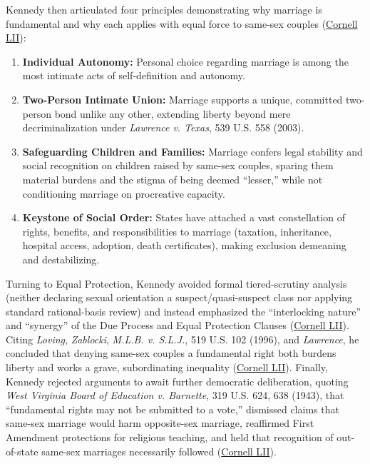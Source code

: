 \documentclass[12pt]{article}
\begin{document}
Kennedy then articulated four principles demonstrating why marriage is fundamental and why each applies with equal force to same-sex couples (\href{https://www.law.cornell.edu/supremecourt/text/14-556}{Cornell LII}):
\begin{enumerate}
    \item \textbf{Individual Autonomy:} Personal choice regarding marriage is among the most intimate acts of self-definition and autonomy.
    \item \textbf{Two-Person Intimate Union:} Marriage supports a unique, committed two-person bond unlike any other, extending liberty beyond mere decriminalization under \textit{Lawrence v. Texas}, 539 U.S. 558 (2003).
    \item \textbf{Safeguarding Children and Families:} Marriage confers legal stability and social recognition on children raised by same-sex couples, sparing them material burdens and the stigma of being deemed ``lesser,'' while not conditioning marriage on procreative capacity.
    \item \textbf{Keystone of Social Order:} States have attached a vast constellation of rights, benefits, and responsibilities to marriage (taxation, inheritance, hospital access, adoption, death certificates), making exclusion demeaning and destabilizing.
\end{enumerate}

Turning to Equal Protection, Kennedy avoided formal tiered-scrutiny analysis (neither declaring sexual orientation a suspect/quasi-suspect class nor applying standard rational-basis review) and instead emphasized the ``interlocking nature'' and ``synergy'' of the Due Process and Equal Protection Clauses (\href{https://www.law.cornell.edu/supremecourt/text/14-556}{Cornell LII}). Citing \textit{Loving}, \textit{Zablocki}, \textit{M.L.B. v. S.L.J.}, 519 U.S. 102 (1996), and \textit{Lawrence}, he concluded that denying same-sex couples a fundamental right both burdens liberty and works a grave, subordinating inequality (\href{https://www.law.cornell.edu/supremecourt/text/14-556}{Cornell LII}). Finally, Kennedy rejected arguments to await further democratic deliberation, quoting \textit{West Virginia Board of Education v. Barnette}, 319 U.S. 624, 638 (1943), that ``fundamental rights may not be submitted to a vote,'' dismissed claims that same-sex marriage would harm opposite-sex marriage, reaffirmed First Amendment protections for religious teaching, and held that recognition of out-of-state same-sex marriages necessarily followed (\href{https://www.law.cornell.edu/supremecourt/text/14-556}{Cornell LII}).
\end{document}

